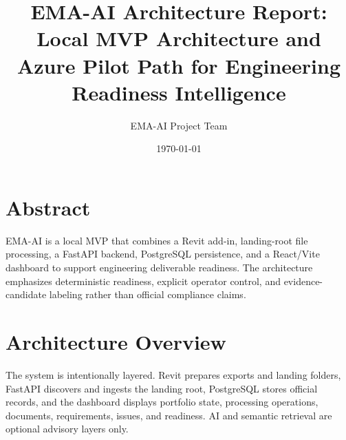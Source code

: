 \documentclass[11pt]{article}
\title{EMA-AI Architecture Report: Local MVP Architecture and Azure Pilot Path for Engineering Readiness Intelligence}
\author{EMA-AI Project Team}
\date{\today}
\begin{document}
\maketitle
\tableofcontents
\newpage

\section{Abstract}
EMA-AI is a local MVP that combines a Revit add-in, landing-root file processing, a FastAPI backend, PostgreSQL persistence, and a React/Vite dashboard to support engineering deliverable readiness. The architecture emphasizes deterministic readiness, explicit operator control, and evidence-candidate labeling rather than official compliance claims.

\section{Architecture Overview}
The system is intentionally layered. Revit prepares exports and landing folders, FastAPI discovers and ingests the landing root, PostgreSQL stores official records, and the dashboard displays portfolio state, processing operations, documents, requirements, issues, and readiness. AI and semantic retrieval are optional advisory layers only.

\begin{center}
\end{center}
\end{document}
